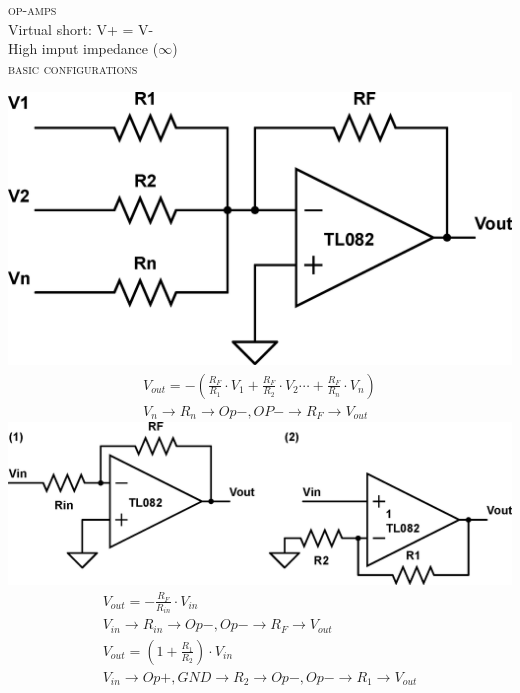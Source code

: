 \documentclass[9pt,letterpaper,english]{article}
\begin{document}
\textsc{op-amps}\\
Virtual short: V+ = V-\\
High imput impedance ($\infty$)\\
\textsc{basic configurations}
\begin{multicols}{2}
\includegraphics[scale=0.2]{opamp-1.eps}
\begin{align*}
V_{out} = -\left(\frac{R_F}{R_1}\cdot V_1 + \frac{R_F}{R_2}\cdot V_2 \cdots + \frac{R_F}{R_n}\cdot V_n\right)\\
V_n\rightarrow R_n\rightarrow Op-, OP- \rightarrow R_F \rightarrow V_{out}
\end{align*}
\includegraphics[scale=0.4]{opamp-2.eps}
\begin{align*}
V_{out} = -\frac{R_F}{R_{in}}\cdot V_{in} \tag*{(1) Inverting}\\
V_{in}\rightarrow R_{in} \rightarrow Op-, Op- \rightarrow R_F \rightarrow V_{out}\\
V_{out} = \left(1 + \frac{R_1}{R_2}\right)\cdot V_{in} \tag*{(2) Non-inverting}\\
V_{in}\rightarrow Op+, GND \rightarrow R_2 \rightarrow Op-, Op- \rightarrow R_1 \rightarrow V_{out}\\
\end{align*}
\end{multicols}
\end{document}
